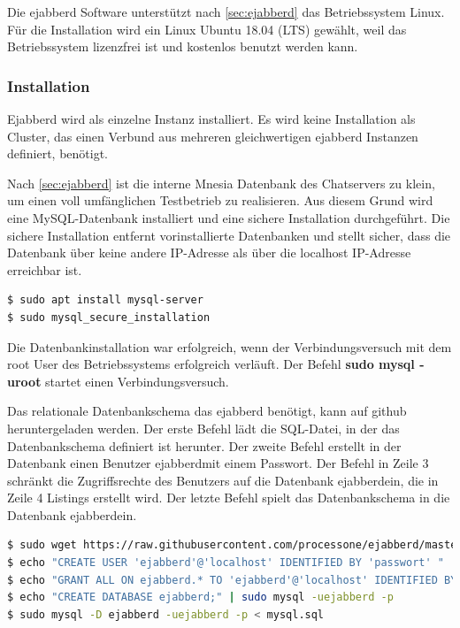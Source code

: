 \documentclass[a4paper,titlepage,halfparskip,12pt]{scrreprt}
\begin{document}
\begin{onehalfspacing}
Die ejabberd Software unterstützt nach \autoref{sec:ejabberd} das Betriebssystem Linux. Für die Installation wird ein Linux Ubuntu 18.04 (LTS) gewählt, weil das Betriebssystem lizenzfrei ist und kostenlos benutzt werden kann.

\subsubsection*{Installation}

Ejabberd wird als einzelne Instanz installiert. Es wird keine Installation als Cluster, das einen Verbund aus mehreren gleichwertigen ejabberd Instanzen definiert, benötigt.

Nach \autoref{sec:ejabberd} ist die interne Mnesia Datenbank des Chatservers zu klein, um einen voll umfänglichen Testbetrieb zu realisieren. Aus diesem Grund wird eine MySQL-Datenbank installiert und eine sichere Installation durchgeführt. Die sichere Installation entfernt vorinstallierte Datenbanken und stellt sicher, dass die Datenbank über keine andere IP-Adresse als über die localhost IP-Adresse erreichbar ist.

\bigskip

\begin{lstlisting}[language=bash, caption={Installation der Mysql-Datenbank}]
$ sudo apt install mysql-server
$ sudo mysql_secure_installation
\end{lstlisting}

Die Datenbankinstallation war erfolgreich, wenn der Verbindungsversuch mit dem root User des Betriebssystems erfolgreich verläuft. Der Befehl \textbf{sudo mysql -uroot} startet einen Verbindungsversuch.

Das relationale Datenbankschema das ejabberd benötigt, kann auf github heruntergeladen werden. Der erste Befehl lädt die SQL-Datei, in der das Datenbankschema definiert ist herunter. Der zweite Befehl erstellt in der Datenbank einen Benutzer \glqq ejabberd\grqq mit einem Passwort. Der Befehl in Zeile 3 schränkt die Zugriffsrechte des Benutzers auf die Datenbank \glqq ejabberd\grqq ein, die in Zeile 4 Listings erstellt wird. Der letzte Befehl spielt das Datenbankschema in die Datenbank \glqq ejabberd\grqq ein.

\bigskip

 \begin{lstlisting}[language=bash, caption={Installation der Mysql-Datenbank}]
$ sudo wget https://raw.githubusercontent.com/processone/ejabberd/master/sql/mysql.sql
$ echo "CREATE USER 'ejabberd'@'localhost' IDENTIFIED BY 'passwort' " | sudo mysql -uroot
$ echo "GRANT ALL ON ejabberd.* TO 'ejabberd'@'localhost' IDENTIFIED BY 'passwort';" | sudo mysql -uroot
$ echo "CREATE DATABASE ejabberd;" | sudo mysql -uejabberd -p
$ sudo mysql -D ejabberd -uejabberd -p < mysql.sql
\end{lstlisting}




\end{onehalfspacing}
\end{document}
